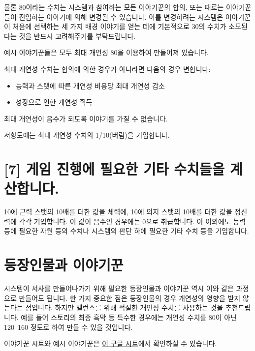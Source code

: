\documentclass{report}
\begin{document}
	물론 80이라는 수치는 시스템과 참여하는 모든 이야기꾼의 합의, 또는 때로는 이야기꾼들이 진입하는 이야기에 의해 변경될 수 있습니다. 이를 변경하려는 시스템은 이야기꾼이 처음에 선택하는 세 가지 배경 이야기를 얻는 데에 기본적으로 30의 수치가 소모된다는 것을 반드시 고려해주기를 부탁드립니다.
	
	예시 이야기꾼들은 모두 최대 개연성 80을 이용하여 만들어져 있습니다.
	
	최대 개연성 수치는 합의에 의한 경우가 아니라면 다음의 경우 변합니다:
	\begin{itemize}
		\item 능력과 스탯에 따른 개연성 비용당 최대 개연성 감소
		\item 성장으로 인한 개연성 획득
	\end{itemize}
	최대 개연성이 음수가 되도록 이야기를 가질 수 없습니다.
	
	저항도에는 최대 개연성 수치의 1/10(버림)을 기입합니다.
	
	\section*{[7] 게임 진행에 필요한 기타 수치들을 계산합니다.}
	10에 근력 스탯의 10배를 더한 값을 체력에, 10에 의지 스탯의 10배를 더한 값을 정신력에 각각 기입합니다. 이 값이 음수인 경우에는 0으로 취급합니다.
	이 이외에도 능력 등에 필요한 자원 등의 수치나 시스템의 판단 하에 필요한 기타 수치 등을 기입합니다. 
	
	\section*{등장인물과 이야기꾼}
	시스템이 서사를 만들어나가기 위해 필요한 등장인물과 이야기꾼 역시 이와 같은 과정으로 만들어도 됩니다. 한 가지 중요한 점은 등장인물의 경우 개연성의 영향을 받지 않는다는 점입니다. 하지만 밸런스를 위해 적절한 개연성 수치를 사용하는 것을 추천드립니다. 예를 들어 스토리의 최종 흑막 등 특수한 경우에는 개연성 수치를 80이 아닌 120~160 정도로 하여 만들 수 있을 것입니다.
	
	\bigskip
	
	이야기꾼 시트와 예시 이야기꾼은 \href{https://docs.google.com/spreadsheets/d/1g3ZO-oALMVbytbE2tvSBdT6czxB32XHZ1crWIGavEhQ/edit?usp=sharing}{이 구글 시트}에서 확인하실 수 있습니다.
\end{document}
